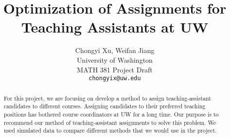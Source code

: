 \documentclass[twoside,twocolumn]{article}
\title{\LARGE \bf
    Optimization of Assignments for Teaching Assistants at UW
    }
\author{ \parbox{3 in}{\centering Chongyi Xu, Weifan Jiang \\
             University of Washington\\
             MATH 381 Project Draft\\
             {\tt\small chongyix@uw.edu}}
    }
\begin{document}
    \maketitle

    \begin{abstract}

    For this project, we are focusing on develop a method to assign teaching-assistant candidates
    to different courses. Assigning candidates to their preferred teaching positions has bothered
    course coordinators at UW for a long time. Our purpose is to recommend our method of teaching-assistant
    assignments to solve this problem. We used simulated data to compare different methods that 
    we would use in the project.
        
    \end{abstract}

    \linespread{1.05} %
\end{document}
